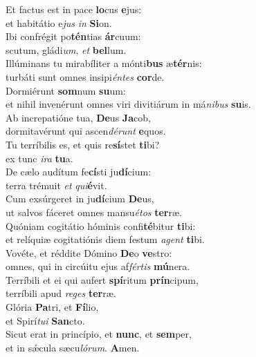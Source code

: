 \evenverse Et factus est in pace \textbf{lo}cus \textbf{e}jus:~\*\\
\evenverse et habitátio e\textit{jus} \textit{in} \textbf{Si}on.\\
\oddverse Ibi confrégit po\textbf{tén}tias \textbf{ár}cuum:~\*\\
\oddverse scutum, gládi\textit{um}, \textit{et} \textbf{bel}lum.\\
\evenverse Illúminans tu mirabíliter a mónti\textbf{bus} æ\textbf{tér}nis:~\*\\
\evenverse turbáti sunt omnes insipi\textit{én}\textit{tes} \textbf{cor}de.\\
\oddverse Dormiérunt \textbf{som}num \textbf{su}um:~\*\\
\oddverse et nihil invenérunt omnes viri divitiárum in má\textit{ni}\textit{bus} \textbf{su}is.\\
\evenverse Ab increpatióne tua, \textbf{De}us \textbf{Ja}cob,~\*\\
\evenverse dormitavérunt qui ascen\textit{dé}\textit{runt} \textbf{e}quos.\\
\oddverse Tu terríbilis es, et quis re\textbf{sí}stet \textbf{ti}bi?~\*\\
\oddverse ex tunc \textit{i}\textit{ra} \textbf{tu}a.\\
\evenverse De cælo audítum fe\textbf{cí}sti ju\textbf{dí}cium:~\*\\
\evenverse terra trémuit \textit{et} \textit{qui}\textbf{é}vit.\\
\oddverse Cum exsúrgeret in ju\textbf{dí}cium \textbf{De}us,~\*\\
\oddverse ut salvos fáceret omnes mansu\textit{é}\textit{tos} \textbf{ter}ræ.\\
\evenverse Quóniam cogitátio hóminis confi\textbf{té}bitur \textbf{ti}bi:~\*\\
\evenverse et relíquiæ cogitatiónis diem festum \textit{a}\textit{gent} \textbf{ti}bi.\\
\oddverse Vovéte, et réddite Dómino \textbf{De}o \textbf{ve}stro:~\*\\
\oddverse omnes, qui in circúitu ejus af\textit{fér}\textit{tis} \textbf{mú}nera.\\
\evenverse Terríbili et ei qui aufert \textbf{spí}ritum \textbf{prín}cipum,~\*\\
\evenverse terríbili apud \textit{re}\textit{ges} \textbf{ter}ræ.\\
\oddverse Glória \textbf{Pa}tri, et \textbf{Fí}lio,~\*\\
\oddverse et Spirí\textit{tu}\textit{i} \textbf{San}cto.\\
\evenverse Sicut erat in princípio, et \textbf{nunc}, et \textbf{sem}per,~\*\\
\evenverse et in sǽcula sæcu\textit{ló}\textit{rum}. \textbf{A}men.\\

